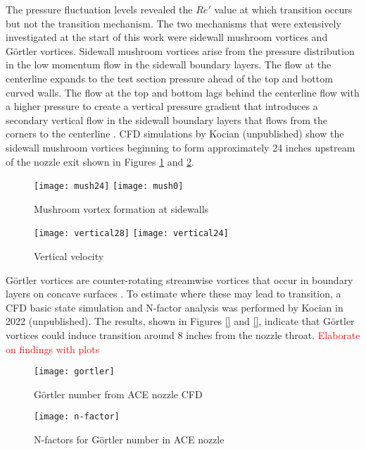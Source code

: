 The pressure fluctuation levels revealed the $Re'$ value at which transition occurs but not the transition mechanism. The two mechanisms that were extensively investigated at the start of this work were sidewall mushroom vortices and Görtler vortices. Sidewall mushroom vortices arise from the pressure distribution in the low momentum flow in the sidewall boundary layers. The flow at the centerline expands to the test section pressure ahead of the top and bottom curved walls. The flow at the top and bottom lags behind the centerline flow with a higher pressure to create a vertical pressure gradient that introduces a secondary vertical flow in the sidewall boundary layers that flows from the corners to the centerline \cite{sabnis}. CFD simulations by Kocian (unpublished) show the sidewall mushroom vortices beginning to form approximately 24 inches upstream of the nozzle exit shown in Figures \ref{fig:mushrooms} and \ref{fig:vertical-vel}. 
\begin{figure}[ht!]
    \centering
    \texttt{[image: mush24]}
    \texttt{[image: mush0]}
    \caption{Mushroom vortex formation at sidewalls}
    \label{fig:mushrooms}
\end{figure}

\begin{figure}[ht!]
    \centering
    \texttt{[image: vertical28]}
    \texttt{[image: vertical24]}
    \caption{Vertical velocity}
    \label{fig:vertical-vel}
\end{figure}

Görtler vortices are counter-rotating streamwise vortices that occur in boundary layers on concave surfaces \cite{saric}. To estimate where these may lead to transition, a CFD basic state simulation and N-factor analysis was performed by Kocian in 2022 (unpublished). The results, shown in Figures \ref{} and \ref{}, indicate that Görtler vortices could induce transition around 8 inches from the nozzle throat. \textcolor{red}{Elaborate on findings with plots}

\begin{figure}[ht]
    \centering
    \texttt{[image: gortler]}
    \caption{Görtler number from ACE nozzle CFD}
    \label{fig:gortler}
\end{figure}

\begin{figure}[ht]
    \centering
    \texttt{[image: n-factor]}
    \caption{N-factors for Görtler number in ACE nozzle}
    \label{fig:n-factor}
\end{figure}

